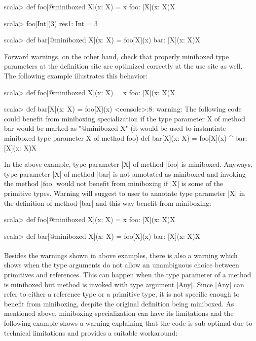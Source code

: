 \begin{lstlisting-nobreak}
scala> def foo[@miniboxed X](x: X) = x
foo: [X](x: X)X

scala> foo[Int](3)
res1: Int = 3

scala> def bar[@miniboxed X](x: X) = foo[X](x)
bar: [X](x: X)X
\end{lstlisting-nobreak}
Forward warnings, on the other hand, check that properly miniboxed type parameters at the definition site are optimized correctly at the use site as well. The following example illustrates this behavior:

\begin{lstlisting-nobreak}
scala> def foo[@miniboxed X](x: X) = x
foo: [X](x: X)X

scala> def bar[X](x: X) = foo[X](x)
<console>:8: warning: The following code could benefit from miniboxing specialization if the type parameter X of method bar would be marked as "@miniboxed X" (it would be used to instantiate miniboxed type parameter X of method foo)
       def bar[X](x: X) = foo[X](x)
                             ^
bar: [X](x: X)X
\end{lstlisting-nobreak}
In the above example, type parameter |X| of method |foo| is miniboxed. Anyways, type parameter |X| of method |bar| is not annotated as miniboxed and invoking the method |foo| would not benefit from miniboxing if |X| is some of the primitive types. Warning will suggest to user to annotate type parameter |X| in the definition of method |bar| and this way benefit from miniboxing:

\begin{lstlisting-nobreak}
scala> def foo[@miniboxed X](x: X) = x
foo: [X](x: X)X

scala> def bar[@miniboxed X](x: X) = foo[X](x)
bar: [X](x: X)X
\end{lstlisting-nobreak}
\paragraph{}
Besides the warnings shown in above examples, there is also a warning which shows when the type arguments do not allow an unambiguous choice between primitives and references. This can happen when the type parameter of a method is miniboxed but method is invoked with type argument |Any|. Since |Any| can refer to either a reference type or a primitive type, it is not specific enough to benefit from miniboxing, despite the original definition being miniboxed. As mentioned above, miniboxing specialization can have its limitations and the following example shows a warning explaining that the code is sub-optimal due to technical limitations and provides a suitable workaround:

